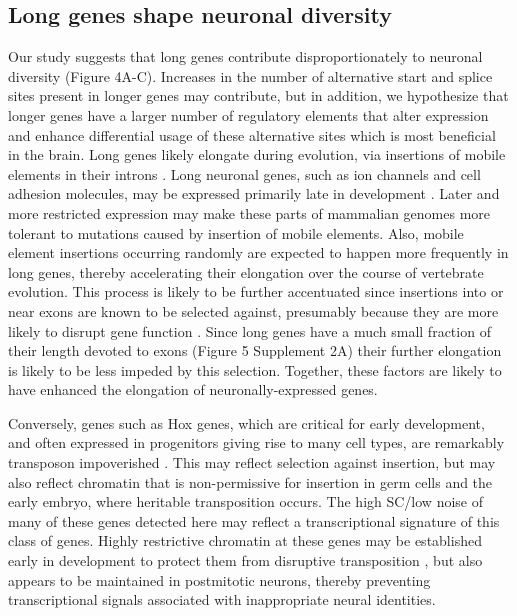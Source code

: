 \subsection{Long genes shape neuronal diversity}
Our study suggests that long genes contribute disproportionately to neuronal diversity (Figure 4A-C). Increases in the number of alternative start and splice sites present in longer genes may contribute, but in addition, we hypothesize that longer genes have a larger number of regulatory elements that alter expression and enhance differential usage of these alternative sites which is most beneficial in the brain. Long genes likely elongate during evolution, via insertions of mobile elements in their introns \citep{Sela_2007,Grishkevich_2014}. Long neuronal genes, such as ion channels and cell adhesion molecules, may be expressed primarily late in development \citep{Okaty_2009}. Later and more restricted expression may make these parts of mammalian genomes more tolerant to mutations caused by insertion of mobile elements. Also, mobile element insertions occurring randomly are expected to happen more frequently in long genes, thereby accelerating their elongation over the course of vertebrate evolution. This process is likely to be further accentuated since insertions into or near exons are known to be selected against, presumably because they are more likely to disrupt gene function \cite{Zhang_2011}. Since long genes have a much small fraction of their length devoted to exons (Figure 5 Supplement 2A) their further elongation is likely to be less impeded by this selection. Together, these factors are likely to have enhanced the elongation of neuronally-expressed genes.   %

Conversely, genes such as Hox genes, which are critical for early development, and often expressed in progenitors giving rise to many cell types, are remarkably transposon impoverished \citep{Chinwalla_2002,Simons_2005}. This may reflect selection against insertion, but may also reflect chromatin that is non-permissive for insertion in germ cells and the early embryo, where heritable transposition occurs. The high SC/low noise of many of these genes detected here may reflect a transcriptional signature of this class of genes. Highly restrictive chromatin at these genes may be established early in development to protect them from disruptive transposition \citep{Montavon_2014}, but also appears to be maintained in postmitotic neurons, thereby preventing transcriptional signals associated with inappropriate neural identities. 

